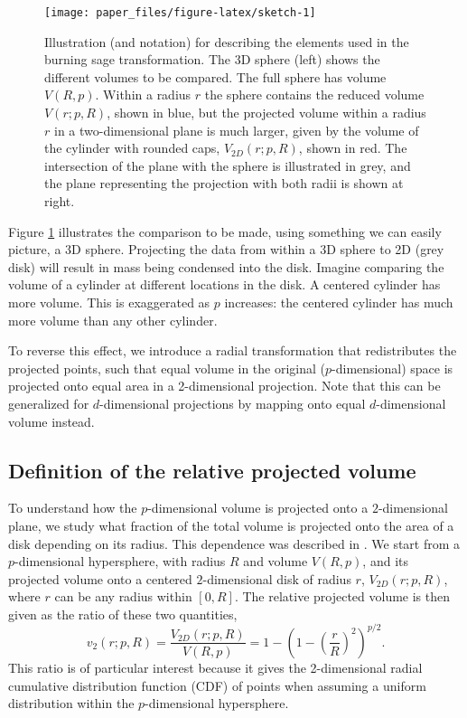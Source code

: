 \documentclass[]{interact}
\theoremstyle{plain}%
\theoremstyle{definition}
\theoremstyle{remark}
\begin{document}
\begin{figure}

{\centering \texttt{[image: paper\_files/figure-latex/sketch-1]} 

}

\caption{Illustration (and notation) for describing the elements used in the burning sage transformation. The 3D sphere (left) shows the different volumes to be compared. The full sphere has volume $V(R, p)$. Within a radius $r$ the sphere contains the reduced volume $V(r; p, R)$, shown in blue, but the projected volume within a radius $r$ in a two-dimensional plane is much larger, given by the volume of the cylinder with rounded caps, $V_{2D}(r; p ,R)$, shown in red. The intersection of the plane with the sphere is illustrated in grey, and the plane representing the projection with both radii is shown at right.}\label{fig:sketch}
\end{figure}

Figure \ref{fig:sketch} illustrates the comparison to be made, using
something we can easily picture, a 3D sphere. Projecting the data from
within a 3D sphere to 2D (grey disk) will result in mass being condensed
into the disk. Imagine comparing the volume of a cylinder at different
locations in the disk. A centered cylinder has more volume. This is
exaggerated as \(p\) increases: the centered cylinder has much more
volume than any other cylinder.

To reverse this effect, we introduce a radial transformation that
redistributes the projected points, such that equal volume in the
original (\(p\)-dimensional) space is projected onto equal area in a
2-dimensional projection. Note that this can be generalized for
\(d\)-dimensional projections by mapping onto equal \(d\)-dimensional
volume instead.

\hypertarget{definition-of-the-relative-projected-volume}{%
\subsection{Definition of the relative projected
volume}\label{definition-of-the-relative-projected-volume}}

To understand how the \(p\)-dimensional volume is projected onto a
\(2\)-dimensional plane, we study what fraction of the total volume is
projected onto the area of a disk depending on its radius. This
dependence was described in \citet{Laa:2020wkm}. We start from a
\(p\)-dimensional hypersphere, with radius \(R\) and volume \(V(R, p)\),
and its projected volume onto a centered \(2\)-dimensional disk of
radius \(r\), \(V_{2D}(r; p, R)\), where \(r\) can be any radius within
\([0, R]\). The relative projected volume is then given as the ratio of
these two quantities, \begin{equation}
v_{2} (r; p, R) = \frac{V_{2D}(r; p, R)}{V(R, p)} = 1 - \left(1-\left(\frac{r}{R}\right)^2\right)^{p/2}.
\label{eq:cdf}
\end{equation} This ratio is of particular interest because it gives the
2-dimensional radial cumulative distribution function (CDF) of points
when assuming a uniform distribution within the \(p\)-dimensional
hypersphere.
\end{document}
